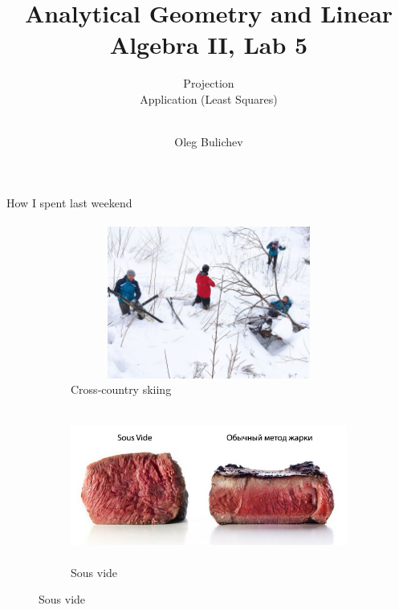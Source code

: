 \documentclass[aspectratio=169]{beamer}
\title[AGLA2]{Analytical Geometry and Linear Algebra II, Lab 5} %
\subtitle{Projection \\ Application (Least Squares) \\ \ 
         } %
\author{Oleg Bulichev}
\newcommand{\fbckg}[1]{\usebackgroundtemplate{\texttt{[image: \#1]}}}%
\begin{document}
\fbckg{fibeamer/figs/title_page.png}

\fbckg{fibeamer/figs/common.png}

\begin{frame}[c]{How I spent last weekend}
\framesubtitle{}
    \begin{figure}[H]
        \begin{subfigure}{0.49\textwidth}
            \centering\includegraphics[height=5cm,width=1\textwidth,keepaspectratio]{skate-skiing.jpg}
            \caption{Cross-country skiing}
            \label{fig:file_name1}
        \end{subfigure}
        \begin{subfigure}{0.49\textwidth}
            \centering\includegraphics[height=5cm,width=1\textwidth,keepaspectratio]{sous_vide.jpg}
            \caption{Sous vide}
            \label{fig:file_name2}
        \end{subfigure}
    
    \end{figure}
\end{frame}
\end{document}
